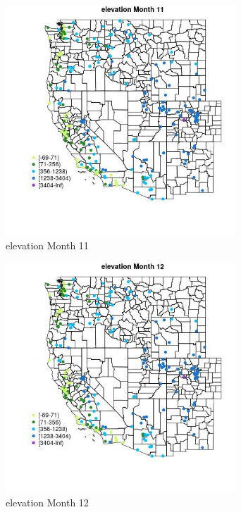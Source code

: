 \begin{figure} 
\centering  
\includegraphics[width=0.77\textwidth]{Code_Outputs/Report_ML_input_PM25_Step4_part_e_de_duplicated_aveswNAs_MapObsMo11elevation.jpg} 
\caption{\label{fig:Report_ML_input_PM25_Step4_part_e_de_duplicated_aveswNAsMapObsMo11elevation}elevation Month 11} 
\end{figure} 
 

\clearpage 

\begin{figure} 
\centering  
\includegraphics[width=0.77\textwidth]{Code_Outputs/Report_ML_input_PM25_Step4_part_e_de_duplicated_aveswNAs_MapObsMo12elevation.jpg} 
\caption{\label{fig:Report_ML_input_PM25_Step4_part_e_de_duplicated_aveswNAsMapObsMo12elevation}elevation Month 12} 
\end{figure} 
 

